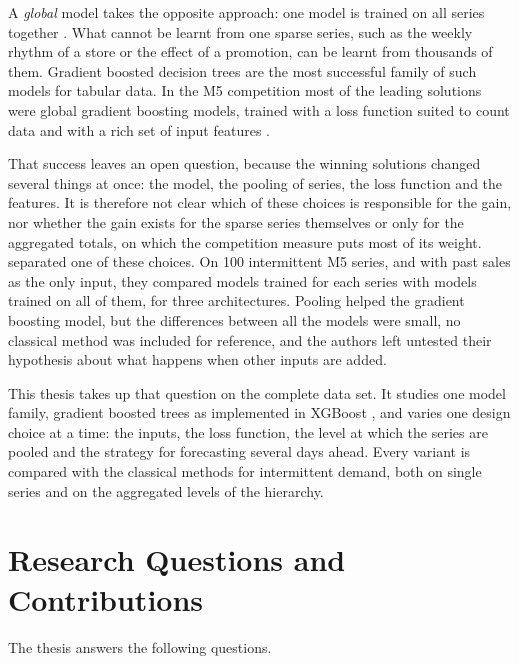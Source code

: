 A \emph{global} model takes the opposite approach: one model is trained on all series together
\citep{januschowski2020,monteromanso2021}. What cannot be learnt from one sparse series, such as the weekly
rhythm of a store or the effect of a promotion, can be learnt from thousands of them. Gradient boosted
decision trees are the most successful family of such models for tabular data. In the M5 competition
most of the leading solutions were global gradient boosting models, trained with a loss function suited
to count data and with a rich set of input features \citep{makridakis2022accuracy}.

That success leaves an open question, because the winning solutions changed several things at once: the
model, the pooling of series, the loss function and the features. It is therefore not clear which of these
choices is responsible for the gain, nor whether the gain exists for the sparse series themselves or only
for the aggregated totals, on which the competition measure puts most of its weight. \citet{tsantilis2025}
separated one of these choices. On 100 intermittent M5 series, and with past sales as the only input, they
compared models trained for each series with models trained on all of them, for three architectures. Pooling
helped the gradient boosting model, but the differences between all the models were small, no classical
method was included for reference, and the authors left untested their hypothesis about what happens when
other inputs are added.

This thesis takes up that question on the complete data set. It studies one model family, gradient boosted
trees as implemented in XGBoost \citep{chen2016}, and varies one design choice at a time: the inputs, the
loss function, the level at which the series are pooled and the strategy for forecasting several days
ahead. Every variant is compared with the classical methods for intermittent demand, both on single series
and on the aggregated levels of the hierarchy.

\section{Research Questions and Contributions}
\label{sec:questions}

The thesis answers the following questions.

